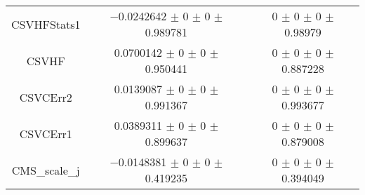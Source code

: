 \begin{table}
\begin{tabular}{ccc}
CSVHFStats1 & \num{-0.0242642} $\pm$ \num{0} $\pm$ \num{0} $\pm$ \num{0.989781} & \num{0} $\pm$ \num{0} $\pm$ \num{0} $\pm$ \num{0.98979}\\
CSVHF & \num{0.0700142} $\pm$ \num{0} $\pm$ \num{0} $\pm$ \num{0.950441} & \num{0} $\pm$ \num{0} $\pm$ \num{0} $\pm$ \num{0.887228}\\
CSVCErr2 & \num{0.0139087} $\pm$ \num{0} $\pm$ \num{0} $\pm$ \num{0.991367} & \num{0} $\pm$ \num{0} $\pm$ \num{0} $\pm$ \num{0.993677}\\
CSVCErr1 & \num{0.0389311} $\pm$ \num{0} $\pm$ \num{0} $\pm$ \num{0.899637} & \num{0} $\pm$ \num{0} $\pm$ \num{0} $\pm$ \num{0.879008}\\
CMS\_scale\_j & \num{-0.0148381} $\pm$ \num{0} $\pm$ \num{0} $\pm$ \num{0.419235} & \num{0} $\pm$ \num{0} $\pm$ \num{0} $\pm$ \num{0.394049}\\
\bottomrule
\end{tabular}
\end{table}